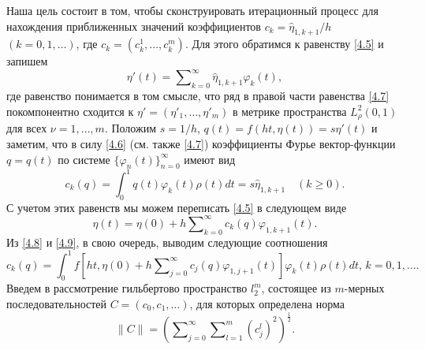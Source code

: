 Наша цель состоит в том, чтобы сконструировать итерационный процесс для нахождения приближенных значений коэффициентов $c_k=\hat \eta_{1,k+1}/h$ $(k=0,1,\ldots)$, где $c_k=(c_k^1,\ldots,c_k^m)$. Для этого обратимся к равенству \eqref{4.5} и запишем
\begin{equation}\label{4.7}
\eta'(t)=  \sum\nolimits_{k=0}^\infty \hat \eta_{1,k+1}\varphi_k(t),
\end{equation}
где равенство понимается в том смысле, что ряд в правой части равенства \eqref{4.7} покомпонентно сходится к $\eta'=(\eta'_1,\ldots,\eta'_m)$ в метрике пространства $L^2_{\rho}(0,1)$ для всех $\nu=1,\ldots,m$. Положим $s=1/h$, $q(t)=f(ht,\eta(t))=s\eta'(t)$ и заметим, что в силу  \eqref{4.6} (см. также \eqref{4.7}) коэффициенты Фурье вектор-функции $q=q(t)$ по системе  $\{\varphi_{n}(t)\}_{n=0}^\infty$ имеют вид
\begin{equation}\label{4.8}
c_k(q)=\int_{0}^1 q(t)\varphi_{k}(t)\rho(t)dt=s\hat \eta_{1,k+1} \quad (k\ge0).
\end{equation}
С учетом этих равенств мы можем переписать \eqref{4.5} в следующем виде
\begin{equation}\label{4.9}
\eta(t)= \eta(0)+ h\sum\nolimits_{k=0}^\infty c_k(q){\varphi}_{1,k+1}(t).
\end{equation}
Из  \eqref{4.8} и \eqref{4.9}, в свою очередь, выводим следующие соотношения
\begin{equation}\label{4.10}
c_k(q)=\int_{0}^1f\left[ht,\eta(0)+ h\sum\nolimits_{j=0}^\infty c_j(q)\varphi_{1,j+1}(t)\right]\varphi_k(t)\rho(t) dt,\, k=0,1,\ldots.
\end{equation}
Введем в рассмотрение гильбертово пространство $l_2^m$, состоящее из $m$-мерных последовательностей $C=(c_0,c_1,\ldots)$, для которых определена норма
$$\|C\|=\left(\sum\nolimits_{j=0}^\infty \sum\nolimits_{l=1}^{m}(c_j^l)^2\right)^\frac12.$$

